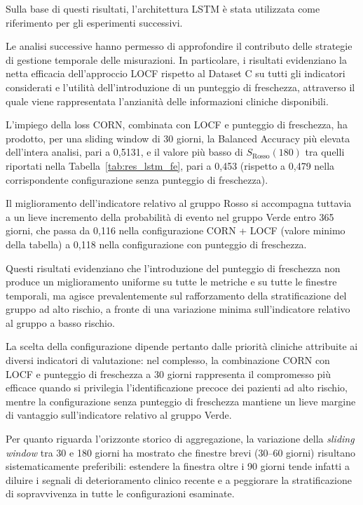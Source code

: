 \documentclass[a4paper,12pt]{report}
\begin{document}
Sulla base di questi risultati, l'architettura LSTM è stata utilizzata come riferimento per gli esperimenti successivi.

Le analisi successive hanno permesso di approfondire il contributo delle strategie di gestione temporale delle misurazioni. In particolare, i risultati evidenziano la netta efficacia dell'approccio LOCF rispetto al Dataset C su tutti gli indicatori considerati e l'utilità dell'introduzione di un punteggio di freschezza, attraverso il quale viene rappresentata l'anzianità delle informazioni cliniche disponibili.

L'impiego della loss CORN, combinata con LOCF e punteggio di freschezza, ha prodotto, per una sliding window di 30 giorni, la Balanced Accuracy più elevata dell'intera analisi, pari a 0,5131, e il valore più basso di \(S_{\text{Rosso}}(180)\) tra quelli riportati nella Tabella~\ref{tab:res_lstm_fe}, pari a 0,453 (rispetto a 0,479 nella corrispondente configurazione senza punteggio di freschezza).

Il miglioramento dell'indicatore relativo al gruppo Rosso si accompagna tuttavia a un lieve incremento della probabilità di evento nel gruppo Verde entro 365 giorni, che passa da 0,116 nella configurazione CORN + LOCF (valore minimo della tabella) a 0,118 nella configurazione con punteggio di freschezza.

Questi risultati evidenziano che l'introduzione del punteggio di freschezza non produce un miglioramento uniforme su tutte le metriche e su tutte le finestre temporali, ma agisce prevalentemente sul rafforzamento della stratificazione del gruppo ad alto rischio, a fronte di una variazione minima sull'indicatore relativo al gruppo a basso rischio.

La scelta della configurazione dipende pertanto dalle priorità cliniche attribuite ai diversi indicatori di valutazione: nel complesso, la combinazione CORN con LOCF e punteggio di freschezza a 30 giorni rappresenta il compromesso più efficace quando si privilegia l'identificazione precoce dei pazienti ad alto rischio, mentre la configurazione senza punteggio di freschezza mantiene un lieve margine di vantaggio sull'indicatore relativo al gruppo Verde.

Per quanto riguarda l'orizzonte storico di aggregazione, la variazione della \textit{sliding window} tra 30 e 180 giorni ha mostrato che finestre brevi (30--60 giorni) risultano sistematicamente preferibili: estendere la finestra oltre i 90 giorni tende infatti a diluire i segnali di deterioramento clinico recente e a peggiorare la stratificazione di sopravvivenza in tutte le configurazioni esaminate.

\nocite{*}
\printbibliography
\end{document}
